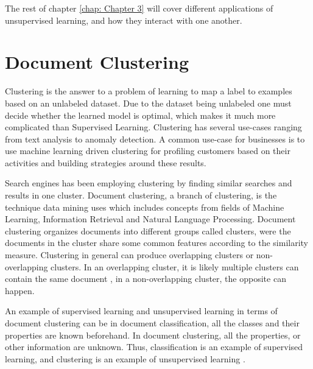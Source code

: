 The rest of chapter \ref{chap: Chapter 3} will cover different applications of unsupervised learning, and how they interact with one another.

\section{Document Clustering}
Clustering is the answer to a problem of learning to map a label to examples based on an unlabeled dataset. Due to the dataset being unlabeled one must decide whether the learned model is optimal, which makes it much more complicated than Supervised Learning. Clustering has several use-cases ranging from text analysis to anomaly detection. A common use-case for businesses is to use machine learning driven clustering for profiling customers based on their activities and building strategies around these results. 

Search engines has been employing clustering by finding similar searches and results in one cluster. Document clustering, a branch of clustering, is the technique data mining uses which includes concepts from fields of Machine Learning, Information Retrieval and Natural Language Processing. Document clustering organizes documents into different groups called clusters, were the documents in the cluster share some common features according to the similarity measure. Clustering in general can produce overlapping clusters or non-overlapping clusters. In an overlapping cluster, it is likely multiple clusters can contain the same document \cite{andrews2007recent}, in a non-overlapping cluster, the opposite can happen. 

An example of supervised learning and unsupervised learning in terms of document clustering can be in document classification, all the classes and their properties are known beforehand. In document clustering, all the properties, or other information are unknown. Thus, classification is an example of supervised learning, and clustering is an example of unsupervised learning \cite{andrews2007recent}.


